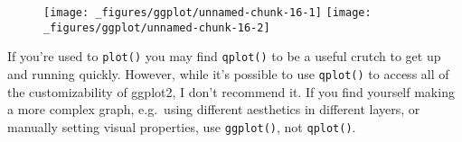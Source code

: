 \begin{figure}[H]
  \texttt{[image: \_figures/ggplot/unnamed-chunk-16-1]}%
  \texttt{[image: \_figures/ggplot/unnamed-chunk-16-2]}
\end{figure}

If you're used to \texttt{plot()} you may find \texttt{qplot()} to be a
useful crutch to get up and running quickly. However, while it's
possible to use \texttt{qplot()} to access all of the customizability of
ggplot2, I don't recommend it. If you find yourself making a more
complex graph, e.g.~using different aesthetics in different layers, or
manually setting visual properties, use \texttt{ggplot()}, not
\texttt{qplot()}.
